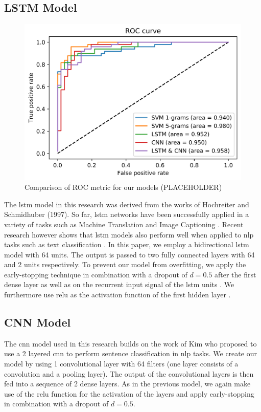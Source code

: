 \documentclass[11pt]{article}
\begin{document}
\subsection{LSTM Model}
\begin{figure}
\centering
  \includegraphics[width=0.8\linewidth]{roc_curve}
 \caption{Comparison of ROC metric for our models (PLACEHOLDER)}
\label{fig:f1_scores}
\end{figure}
The \ac{lstm} model in this research was derived from the works of Hochreiter and Schmidhuber (1997). So far, \ac{lstm} networks have been successfully applied in a variety of tasks such as Machine Translation \cite{RN76} and Image Captioning \cite{RN77}. Recent research however shows that \ac{lstm} models also perform well when applied to \ac{nlp} tasks such as text classification \cite{RN57,RN78}.
\newline 
In this paper, we employ a bidirectional \ac{lstm} model with 64 units. The output is passed to two fully connected layers with 64 and 2 units respectively. To prevent our model from overfitting, we  apply the early-stopping technique \cite{RN79} in combination with a dropout of $d=0.5$ after the first dense layer as well as on the recurrent input signal of the \ac{lstm} units \cite{RN66}. We furthermore use \ac{relu} as the activation function of the first hidden layer \cite{RN71,RN72}. 
\subsection{CNN Model}
The \ac{cnn} model used in this research builds on the work of Kim  who proposed to use a 2 layered \ac{cnn} to perform sentence classification in \ac{nlp} tasks. We create our model by using 1 convolutional layer with 64 filters (one layer consists of a convolution and a pooling layer). The output of the convolutional layers is then fed into a sequence of 2 dense layers.  As in the previous model, we again make use of the \ac{relu} function for the activation of the layers and apply early-stopping in combination with a dropout of $d=0.5$.
\end{document}

